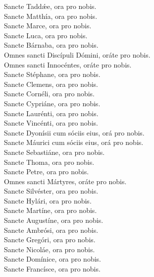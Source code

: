 {	Sancte Taddǽe, ora pro nobis. \\
	Sancte Matthía, ora pro nobis. \\
	Sancte Marce, ora pro nobis. \\
	Sancte Luca, ora pro nobis. \\
	Sancte Bárnaba, ora pro nobis. \\
	Omnes sancti Discípuli Dómini, oráte pro nobis. \\
	Omnes sancti Innocéntes, oráte pro nobis. \\
	Sancte Stéphane, ora pro nobis. \\
		Sancte Clemens, ora pro nobis. \\
		Sancte Cornéli, ora pro nobis. \\
		Sancte Cypriáne, ora pro nobis. \\
	Sancte Laurénti, ora pro nobis. \\
	Sancte Vincénti, ora pro nobis. \\
		Sancte Dyonísii cum sóciis eius, orá pro nobis. \\
		Sancte Máurici cum sóciis eius, orá pro nobis. \\
		Sancte Sebastiáne, ora pro nobis. \\
		Sancte Thoma, ora pro nobis. \\
		Sancte Petre, ora pro nobis. \\
	Omnes sancti Mártyres, oráte pro nobis. \\
	Sancte Silvéster, ora pro nobis. \\
		Sancte Hylári, ora pro nobis. \\
	Sancte Martíne, ora pro nobis. \\
	Sancte Augustíne, ora pro nobis. \\
	Sancte Ambrósi, ora pro nobis. \\
	Sancte Gregóri, ora pro nobis. \\
	Sancte Nicoláe, ora pro nobis. \\
	Sancte Domínice, ora pro nobis. \\
	Sancte Francísce, ora pro nobis. \\
}
